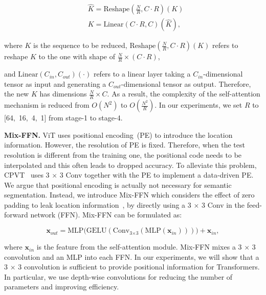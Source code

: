 \begin{equation}
    \begin{aligned}

    &{\hat{K}} = {\text{Reshape}(\frac{N}{R},C \cdot R)(K)}\\

    &{K} = {\text{Linear}(C \cdot R, C)({\hat{K}}),}
    \end{aligned}
    \label{eqn:reduce}
\end{equation}

where $K$ is the sequence to be reduced, $\text{Reshape}(\frac{N}{R},C \cdot R)(K)$ refers to reshape $K$ to the one with shape of $\frac{N}{R}\times (C \cdot R)$,

and $\text{Linear}(C_{in}, C_{out})( \cdot)$ refers to a linear layer taking a $C_{in}$-dimensional tensor as input and generating a $C_{out}$-dimensional tensor as output. Therefore, the new $K$ has dimensions $\frac{N}{R} \times C$. As a result, the complexity of the self-attention mechanism is reduced from $O(N^2)$ to $O(\frac{N^2}{R})$. In our experiments, we set $R$ to [64,~16,~4,~1] from stage-1 to stage-4. 

\textbf{Mix-FFN.} 
ViT uses positional encoding~(PE) to introduce the location information. However, the resolution of PE is fixed. Therefore, when the test resolution is different from the training one, the positional code needs to be interpolated and this often leads to dropped accuracy. To alleviate this problem, CPVT~\cite{chu2021conditional} uses 3 $\times$ 3 Conv together with the PE to implement a data-driven PE. We argue that positional encoding is actually not necessary for semantic segmentation. Instead, we introduce Mix-FFN which considers the effect of zero padding to leak location information~\cite{islam2020much}, by directly using a 3 $\times$ 3 Conv in the feed-forward network (FFN). Mix-FFN can be formulated as:

\begin{equation}
    {\mathbf{x}_{out} = {\text{MLP(GELU}(\text{Conv}_{\text{3} \times \text{3}}(\text{MLP}(\mathbf{x}_{in}))))+ \mathbf{x}_{in}},}
    \label{eqn:mixffn}
\end{equation}

where $\mathbf{x}_{in}$ is the feature from the self-attention module. Mix-FFN mixes a 3 $\times$ 3 convolution and an MLP into each FFN. In our experiments, we will show that a 3 $\times$ 3 convolution is sufficient to provide positional information for Transformers. In particular, we use depth-wise convolutions for reducing the number of parameters and improving efficiency. 


